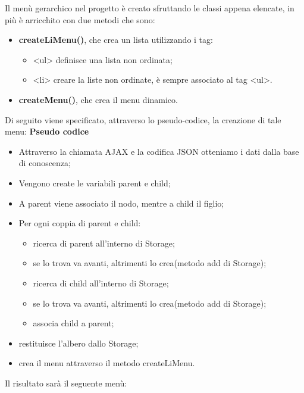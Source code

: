 \documentclass[a4paper,11pt]{article}
\begin{document}
Il menù gerarchico nel progetto è creato sfruttando le classi appena elencate, in più è arricchito con due metodi che sono:
\begin{itemize}
	\item \textbf{createLiMenu()}, che crea un lista utilizzando i tag:
	\begin{itemize}
		\item <ul> definisce una lista non ordinata;
		\item <li> creare la liste non ordinate, è sempre associato al tag <ul>.
	\end{itemize}
	\item \textbf{createMenu()}, che crea il menu dinamico.
\end{itemize}
Di seguito viene specificato, attraverso lo pseudo-codice, la creazione di tale menu:\newline
\textbf{Pseudo codice}
	\begin{itemize}
	\item Attraverso la chiamata AJAX e la codifica JSON otteniamo i dati dalla base di conoscenza;
	\item Vengono create le variabili parent e child;
	\item A parent viene associato il nodo, mentre a child il figlio;
	\item Per ogni coppia di parent e child:
		\begin{itemize}
		\item ricerca di parent all'interno di Storage; 
		\item se lo trova va avanti, altrimenti lo crea(metodo add di Storage);
		\item ricerca di child all'interno di Storage;
		\item se lo trova va avanti, altrimenti lo crea(metodo add di Storage);
		\item associa child a parent;
		
		\end{itemize}		
	\item restituisce l'albero dallo Storage;
	\item crea il menu attraverso il metodo createLiMenu.
	\end{itemize} 	
Il risultato sarà il seguente menù:
\end{document}
